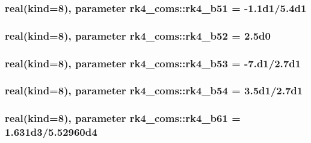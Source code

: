 \subsubsection[{\texorpdfstring{rk4\+\_\+b51}{rk4_b51}}]{\setlength{\rightskip}{0pt plus 5cm}real(kind=8), parameter rk4\+\_\+coms\+::rk4\+\_\+b51 = -\/1.\+1d1/5.\+4d1}\hypertarget{namespacerk4__coms_a0667d689a2690f395681dd54718dd9b0}{}\label{namespacerk4__coms_a0667d689a2690f395681dd54718dd9b0}
\subsubsection[{\texorpdfstring{rk4\+\_\+b52}{rk4_b52}}]{\setlength{\rightskip}{0pt plus 5cm}real(kind=8), parameter rk4\+\_\+coms\+::rk4\+\_\+b52 = 2.\+5d0}\hypertarget{namespacerk4__coms_a08136775ca79aa4cfb6e2bc844bfb689}{}\label{namespacerk4__coms_a08136775ca79aa4cfb6e2bc844bfb689}
\subsubsection[{\texorpdfstring{rk4\+\_\+b53}{rk4_b53}}]{\setlength{\rightskip}{0pt plus 5cm}real(kind=8), parameter rk4\+\_\+coms\+::rk4\+\_\+b53 = -\/7.d1/2.\+7d1}\hypertarget{namespacerk4__coms_adedd306e0a9a351610026b3a12d2e5ce}{}\label{namespacerk4__coms_adedd306e0a9a351610026b3a12d2e5ce}
\subsubsection[{\texorpdfstring{rk4\+\_\+b54}{rk4_b54}}]{\setlength{\rightskip}{0pt plus 5cm}real(kind=8), parameter rk4\+\_\+coms\+::rk4\+\_\+b54 = 3.\+5d1/2.\+7d1}\hypertarget{namespacerk4__coms_a3d702309397c009b9a62c0900da4a7c5}{}\label{namespacerk4__coms_a3d702309397c009b9a62c0900da4a7c5}
\subsubsection[{\texorpdfstring{rk4\+\_\+b61}{rk4_b61}}]{\setlength{\rightskip}{0pt plus 5cm}real(kind=8), parameter rk4\+\_\+coms\+::rk4\+\_\+b61 = 1.\+631d3/5.\+52960d4}\hypertarget{namespacerk4__coms_a69b8b27ac5165b14e52efd1d57e3247d}{}\label{namespacerk4__coms_a69b8b27ac5165b14e52efd1d57e3247d}
